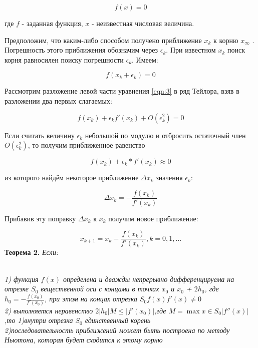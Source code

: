 \documentclass[12pt, a4paper]{article}
\begin{document}
	 \begin{equation}
	 	f(x)=0
	 \end{equation}
	 
	 где $f$ - заданная функция, $x$ - неизвестная числовая величина.
	 
	 Предположим, что каким-либо способом получено приближение $x_k$ к корню $x_\infty$ . Погрешность этого приближения обозначим через $\epsilon_k$. При известном $x_k$ поиск корня равносилен поиску погрешности $\epsilon_k$. Имеем: 
	 
	 \begin{equation} \label{eqn:3}
	 	f(x_k + \epsilon_k) = 0
	 \end{equation}
	 
	 Рассмотрим разложение левой части уравнения \eqref{eqn:3} в ряд Тейлора, взяв в разложении два первых слагаемых:
	 
	 \begin{equation}
		 f(x_k) + \epsilon_k f'(x_k) + O(\epsilon_k^2) = 0
	 \end{equation}
	 
	 Если считать величину $\epsilon_k$ небольшой по модулю и отбросить остаточный член $O(\epsilon_k^2)$, то получим приближенное равенство
	 
	 \begin{equation}
	 	f(x_k) + \epsilon_k * f'(x_k)\approx 0
	 \end{equation}
	 
	 из которого найдём некоторое приближение $\Delta x_k$ значения $\epsilon_k$:
	 
	 \begin{equation}
	 	\Delta x_k = - \frac{f(x_k)}{f'(x_k)}
	 \end{equation}
	 
	 Прибавив эту поправку $\Delta x_k$ к $x_k$ получим новое приближение:
	 
	 
	 \begin{equation} \label{eqn:newton}
	 	x_{k+1} = x_k - \frac{f(x_k)}{f'(x_k)}, k=0,1,\dots 
	 \end{equation}
	\textbf{Теорема 2.} \textit{Если:}
	
	\textit{\\1) функция $f(x)$ определена и дважды непрерывно дифференцируема на отрезке $S_0$ вещественной оси с
	концами в точках $x_0$ и $x_0$ + $2h_0$, где $h_0 = -\frac{f(x_0)}{f'(x_0)}$, при этом на концах отрезка $S_0  f(x)f'(x)\neq0$\\
	2) выполняется неравенство $2|h_0|M\le|f'(x_0)|$,где $M=\max{x\in S_0}|f''(x)|$,то
	1)внутри отрезка $S_0$ единственный корень\\
	2)последовательность приближений может быть построена по методу Ньютона, которая будет сходится к этому корню
}
\end{document}
